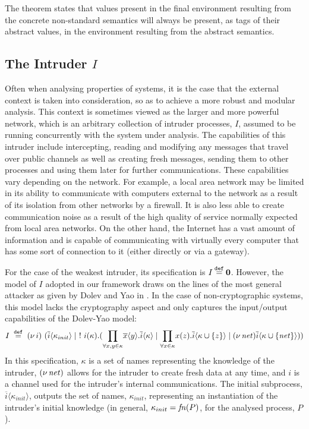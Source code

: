 \documentclass[10pt,a4paper,final,oneside,fleqn]{book}
\newcommand*{\eqdef}{\mathbin{\mathop{=}\limits^{\texttt{def}}}}
\begin{document}
\noindent
The theorem states that values present in the final environment resulting from the concrete non-standard semantics will always be present, as tags of their abstract values, in the environment resulting from the abstract semantics.
\subsection{The Intruder $I$\label{sect:intruderpi}}
Often when analysing properties of systems, it is the case that the external context is taken into consideration, so as to achieve a more robust and modular analysis.  This context is sometimes viewed as the larger and more powerful network, which is an arbitrary collection of intruder processes, $I$, assumed to be running concurrently with the system under analysis.  The capabilities of this intruder include intercepting, reading and modifying any messages that travel over public channels as well as creating fresh messages, sending them to other processes and using them later for further communications.  These capabilities vary depending on the network.  For example, a local area network may be limited in its ability to communicate with computers external to the network as a result of its isolation from other networks by a firewall.  It is also less able to create communication noise as a result of the high quality of service normally expected from local area networks.  On the other hand, the Internet has a vast amount of information and is capable of communicating with virtually every computer that has some sort of connection to it (either directly or via a gateway).

For the case of the weakest intruder, its specification is $I\eqdef{\bf 0}$. However, the model of $I$ adopted in our framework draws on the lines of the most general attacker as given by Dolev and Yao in \cite{dolev1}.  In the case of non-cryptographic systems, this model lacks the cryptography aspect and only captures the input/output capabilities of the Dolev-Yao model:
\[I~\eqdef~(\nu~\!i)~(\overline{i}\langle\kappa_{init}\rangle\mid~!~i(\kappa).(\underset{\forall x,y\in\kappa}{\prod}\overline{x}\langle y\rangle.\overline{i}\langle\kappa\rangle\mid\underset{\forall x\in\kappa}{\prod}x(z).\overline{i}\langle\kappa\cup \{z\}\rangle\mid(\nu~\!\mbox{{\itshape net\/}})\overline{i}\langle\kappa\cup\{\mbox{{\itshape net\/}}\}\rangle))\]
In this specification, $\kappa$ is a set of names representing the knowledge of the intruder, $(\nu~\!\mbox{{\itshape net\/}})$ allows for the intruder to create fresh data at any time, and $i$ is a channel used for the intruder's internal communications.  The initial subprocess, $\overline{i}\langle\kappa_{init}\rangle$, outputs the set of names, $\kappa_{init}$, representing an instantiation of the intruder's initial knowledge (in general, $\kappa_{init}=\mbox{{\itshape fn\/}}(P)$, for the analysed process, $P$).
\end{document}
